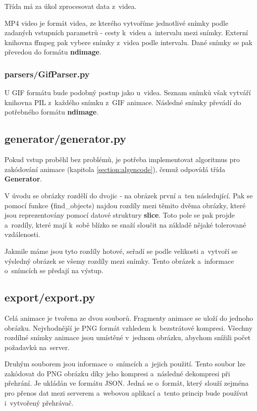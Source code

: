 Třída má za úkol zprocesovat data z~videa.

MP4 video je formát videa, ze kterého vytvoříme jednotlivé snímky podle zadaných vstupních parametrů - cesty k~videu a~intervalu mezi snímky. Externí knihovna ffmpeg\cite{videolib} pak vybere snímky z~videa podle intervalu. Dané snímky se pak převedou do formátu \textbf{ndimage}.

\subsubsection*{parsers/GifParser.py}

U GIF formátu bude podobný postup jako u~videa. Seznam snímků však vytváří knihovna PIL\cite{PIL} z~každého snímku z~GIF animace. Následné snímky převádí do potřebného formátu \textbf{ndimage}.

\subsection{generator/generator.py}

Pokud vstup proběhl bez problémů, je potřeba implementovat algoritmus pro zakódování animace (kapitola \ref{section:algencode}), čemuž odpovídá třída \textbf{Generator}.

V úvodu se obrázky rozdělí do dvojic - na obrázek první a~ten následující. Pak se pomocí funkce \textbf(find\_objects) najdou rozdíly mezi těmito dvěma obrázky, které jsou reprezentovány pomocí datové struktury \textbf{slice}. Toto pole se pak projde a~rozdíly, které mají k~sobě blízko se snaží sloučit na základě nějaké tolerované vzdálenosti.

Jakmile máme jsou tyto rozdíly hotové, seřadí se podle velikosti a~vytvoří se výsledný obrázek se všemy rozdíly mezi snímky. Tento obrázek a~informace o~snímcích se předají na výstup.


\subsection{export/export.py}

Celá animace je tvořena ze dvou souborů. Fragmenty animace se uloží do jednoho obrázku. Nejvhodnější je PNG formát vzhledem k~bezstrátové kompresi. Všechny rozdílné snímky animace jsou umístěné v~jednom obrázku, abychom snížili počet požadavků na~server. 

Druhým souborem jsou informace o~snímcích a~jejich použití. Tento soubor lze zakódovat do PNG obrázku díky jeho kompresi a~následné dekompresi při přehrání. Je ukládán ve formátu JSON. Jedná se o~formát, který slouží zejména pro přenos dat mezi serverem a~webovou aplikací a~tento princip bude používat i~vytvořený přehrávač. 

